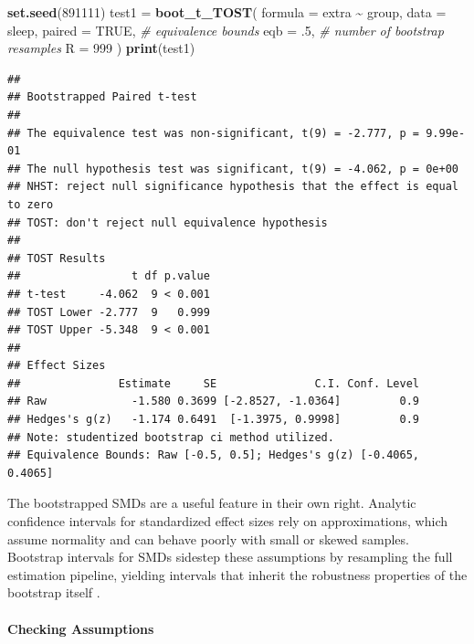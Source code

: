 \documentclass[]{interact}
\theoremstyle{plain}%
\theoremstyle{definition}
\theoremstyle{remark}
\newenvironment{Shaded}{\begin{snugshade}}{\end{snugshade}}
\newcommand{\AttributeTok}[1]{\textcolor[rgb]{0.13,0.29,0.53}{#1}}
\newcommand{\CommentTok}[1]{\textcolor[rgb]{0.56,0.35,0.01}{\textit{#1}}}
\newcommand{\ConstantTok}[1]{\textcolor[rgb]{0.56,0.35,0.01}{#1}}
\newcommand{\DecValTok}[1]{\textcolor[rgb]{0.00,0.00,0.81}{#1}}
\newcommand{\FunctionTok}[1]{\textcolor[rgb]{0.13,0.29,0.53}{\textbf{#1}}}
\newcommand{\NormalTok}[1]{#1}
\newcommand{\OtherTok}[1]{\textcolor[rgb]{0.56,0.35,0.01}{#1}}
\newcommand{\SpecialCharTok}[1]{\textcolor[rgb]{0.81,0.36,0.00}{\textbf{#1}}}
\begin{document}
\begin{Shaded}
\begin{Highlighting}[]
\FunctionTok{set.seed}\NormalTok{(}\DecValTok{891111}\NormalTok{)}
\NormalTok{test1 }\OtherTok{=} \FunctionTok{boot\_t\_TOST}\NormalTok{(}
  \AttributeTok{formula =}\NormalTok{ extra }\SpecialCharTok{\textasciitilde{}}\NormalTok{ group,}
  \AttributeTok{data =}\NormalTok{ sleep,}
  \AttributeTok{paired =} \ConstantTok{TRUE}\NormalTok{,}
  \CommentTok{\# equivalence bounds}
  \AttributeTok{eqb =}\NormalTok{ .}\DecValTok{5}\NormalTok{,}
  \CommentTok{\# number of bootstrap resamples}
  \AttributeTok{R =} \DecValTok{999}
\NormalTok{)}
\FunctionTok{print}\NormalTok{(test1)}
\end{Highlighting}
\end{Shaded}

\begin{verbatim}
## 
## Bootstrapped Paired t-test
## 
## The equivalence test was non-significant, t(9) = -2.777, p = 9.99e-01
## The null hypothesis test was significant, t(9) = -4.062, p = 0e+00
## NHST: reject null significance hypothesis that the effect is equal to zero 
## TOST: don't reject null equivalence hypothesis
## 
## TOST Results 
##                 t df p.value
## t-test     -4.062  9 < 0.001
## TOST Lower -2.777  9   0.999
## TOST Upper -5.348  9 < 0.001
## 
## Effect Sizes 
##               Estimate     SE               C.I. Conf. Level
## Raw             -1.580 0.3699 [-2.8527, -1.0364]         0.9
## Hedges's g(z)   -1.174 0.6491  [-1.3975, 0.9998]         0.9
## Note: studentized bootstrap ci method utilized.
## Equivalence Bounds: Raw [-0.5, 0.5]; Hedges's g(z) [-0.4065, 0.4065]
\end{verbatim}

The bootstrapped SMDs are a useful feature in their own right. Analytic
confidence intervals for standardized effect sizes rely on
approximations, which assume normality and can behave poorly with small
or skewed samples. Bootstrap intervals for SMDs sidestep these
assumptions by resampling the full estimation pipeline, yielding
intervals that inherit the robustness properties of the bootstrap itself
\citep{Kirby2013}.

\paragraph{Checking Assumptions}\label{checking-assumptions-5}
\end{document}
